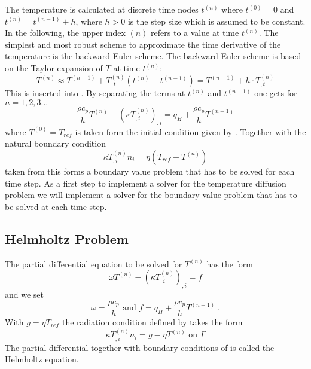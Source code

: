 The temperature is calculated at discrete time nodes $t^{(n)}$ where 
$t^{(0)}=0$ and $t^{(n)}=t^{(n-1)}+h$, where $h>0$ is the step size which is assumed to be constant.
In the following, the upper index ${(n)}$ refers to a value at time $t^{(n)}$.
The simplest and most robust scheme to approximate the time derivative of the
temperature is the backward Euler scheme.
The backward Euler scheme is based on the Taylor expansion of $T$ at time $t^{(n)}$:
\begin{equation}
T^{(n)}\approx T^{(n-1)}+T_{,t}^{(n)}(t^{(n)}-t^{(n-1)})
=T^{(n-1)} + h \cdot T_{,t}^{(n)}
\label{DIFFUSION TEMP EQ 6}
\end{equation}
This is inserted into . By separating the terms at
$t^{(n)}$ and $t^{(n-1)}$ one gets for $n=1,2,3\ldots$
\begin{equation}
\frac{\rho c_p}{h} T^{(n)} - (\kappa T^{(n)}_{,i})_{,i} = q_H +  \frac{\rho c_p}{h} T^{(n-1)}
\label{DIFFUSION TEMP EQ 7}
\end{equation}
where $T^{(0)}=T_{ref}$ is taken form the initial condition given by .
Together with the natural boundary condition 
\begin{equation}
 \kappa T_{,i}^{(n)} n_i = \eta (T_{ref}-T^{(n)}) 
\label{DIFFUSION TEMP EQ 2222}
\end{equation}
taken from  this forms a boundary value problem that
has to be solved for each time step. 
As a first step to implement a solver for the temperature diffusion problem we
will implement a solver for the boundary value problem that has to be solved
at each time step.

\subsection{\label{DIFFUSION HELM SEC}Helmholtz Problem}
The partial differential equation to be solved for $T^{(n)}$ has the form 
\begin{equation}
\omega T^{(n)} - (\kappa T^{(n)}_{,i})_{,i} = f
\label{DIFFUSION HELM EQ 1}
\end{equation}
and we set
\begin{equation}
\omega=\frac{\rho c_p}{h} \mbox{ and } f=q_H +\frac{\rho c_p}{h}T^{(n-1)} \;.
\label{DIFFUSION HELM EQ 1b}
\end{equation}
With $g=\eta T_{ref}$ the radiation condition defined by  takes the form 
\begin{equation}
    \kappa T^{(n)}_{,i} n_{i} = g - \eta T^{(n)}\text{ on $\Gamma$}
\label{DIFFUSION HELM EQ 2}
\end{equation}
The partial differential  together with boundary
conditions of  is called the Helmholtz equation.

